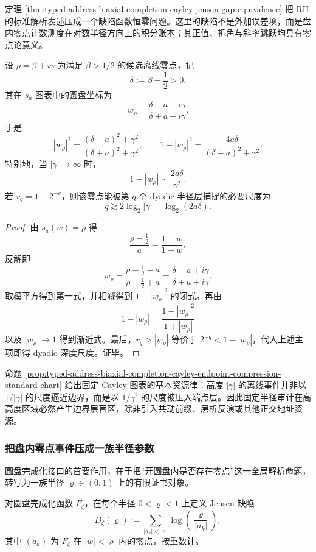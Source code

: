 定理 \ref{thm:typed-address-biaxial-completion-cayley-jensen-gap-equivalence} 把 RH 的标准解析表述压成一个缺陷函数恒零问题。这里的缺陷不是外加误差项，而是盘内零点计数测度在对数半径方向上的积分账本；其正值、折角与斜率跳跃均具有零点论意义。

\begin{proposition}[标准右半平面图表中的端点压缩]\label{prop:typed-address-biaxial-completion-cayley-endpoint-compression-standard-chart}
设 \(\rho=\beta+i\gamma\) 为满足 \(\beta>1/2\) 的候选离线零点，记
\[
\delta:=\beta-\frac12>0.
\]
其在 \(s_a\) 图表中的圆盘坐标为
\[
w_\rho
=
\frac{\delta-a+i\gamma}{\delta+a+i\gamma}.
\]
于是
\[
|w_\rho|^2
=
\frac{(\delta-a)^2+\gamma^2}{(\delta+a)^2+\gamma^2},
\qquad
1-|w_\rho|^2
=
\frac{4a\delta}{(\delta+a)^2+\gamma^2}.
\]
特别地，当 \(|\gamma|\to\infty\) 时，
\[
1-|w_\rho|
\sim
\frac{2a\delta}{\gamma^2}.
\]
若 \(r_q=1-2^{-q}\)，则该零点能被第 \(q\) 个 dyadic 半径层捕捉的必要尺度为
\[
q\gtrsim
2\log_2|\gamma|-\log_2(2a\delta).
\]
\end{proposition}
\begin{proof}
由 \(s_a(w)=\rho\) 得
\[
\frac{\rho-\frac12}{a}=\frac{1+w}{1-w},
\]
反解即
\[
w_\rho=
\frac{\rho-\frac12-a}{\rho-\frac12+a}
=
\frac{\delta-a+i\gamma}{\delta+a+i\gamma}.
\]
取模平方得到第一式，并相减得到 \(1-|w_\rho|^2\) 的闭式。再由
\[
1-|w_\rho|=\frac{1-|w_\rho|^2}{1+|w_\rho|}
\]
以及 \(|w_\rho|\to1\) 得到渐近式。最后，\(r_q>|w_\rho|\) 等价于 \(2^{-q}<1-|w_\rho|\)，代入上述主项即得 dyadic 深度尺度。证毕。
\end{proof}

命题 \ref{prop:typed-address-biaxial-completion-cayley-endpoint-compression-standard-chart} 给出固定 Cayley 图表的基本资源律：高度 \(|\gamma|\) 的离线事件并非以 \(1/|\gamma|\) 的尺度逼近边界，而是以 \(1/\gamma^2\) 的尺度被压入端点层。因此固定半径审计在高高度区域必然产生边界层盲区，除非引入共动前缀、层析反演或其他正交地址资源。

\subsubsection{把盘内零点事件压成一族半径参数}\label{subsubsec:typed-address-biaxial-completion-jensen-defect-radius-family}
圆盘完成化接口的首要作用，在于把“开圆盘内是否存在零点”这一全局解析命题，转写为一族半径 \(\varrho\in(0,1)\) 上的有限证书对象。

\begin{definition}[Jensen 缺陷]\label{def:typed-address-biaxial-completion-jensen-defect}
对圆盘完成化函数 \(F_{\zeta}\)，在每个半径 \(0<\varrho<1\) 上定义 Jensen 缺陷
\[
D_{\zeta}(\varrho)
:=
\sum_{|a_k|<\varrho}\log\!\left(\frac{\varrho}{|a_k|}\right),
\]
其中 \((a_k)\) 为 \(F_{\zeta}\) 在 \(|w|<\varrho\) 内的零点，按重数计。
\end{definition}


